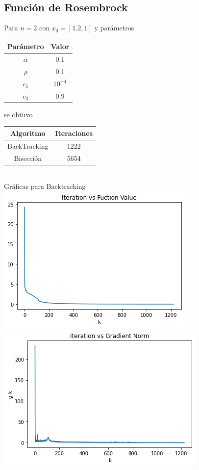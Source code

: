 \documentclass[11pt,letterpaper]{article}
\theoremstyle{definition}
\theoremstyle{definition}
\theoremstyle{definition}
\begin{document}
\subsection{Función de Rosembrock}
Para $ n = 2 $ con $ x_0 = [1.2, 1] $ y parámetros
\begin{center}
	\begin{tabular}{cc}
	\hline
	Parámetro & Valor \\
	\hline
	$\alpha $ & 0.1 \\
	$ \rho $  & 0.1 \\
	$ c_1 $ & $ 10^{-4} $ \\
	$ c_2 $  & $ 0.9 $ \\
	\hline
	\end{tabular}
\end{center}
se obtuvo
\begin{center}
	\begin{tabular}{cc}
		\hline
		Algoritmo & Iteraciones \\
		\hline
		BackTracking & 1222 \\
		Bisección  & 5654 \\
		\hline
	\end{tabular}
	\\
	Gráficas para Backtracking
	\\
	\includegraphics[width=0.8\linewidth]{graficas/rosembrock_backtracking_2f}
	\\
	\includegraphics[width=0.8\linewidth]{graficas/rosembrock_backtracking_2g}

\end{center}
\end{document}
